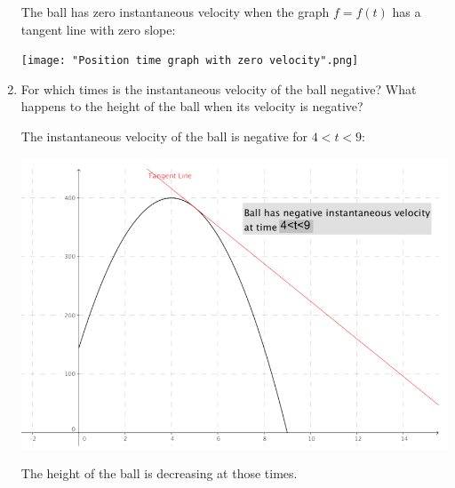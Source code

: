 \documentclass[nooutcomes,handout]{ximera}
\begin{document}
\begin{problem}
\begin{enumerate}
		\begin{freeResponse}		 
		 The ball has zero instantaneous velocity when the graph $f=f(t)$  has a tangent line with zero slope:
        \begin{image}
          \texttt{[image: "Position time graph with zero velocity".png]}
        \end{image}
		\end{freeResponse}
		
		
		
		\item  For which times is the instantaneous velocity of the ball negative?
      What happens to the height of the ball when its velocity is negative?
      \begin{freeResponse}
        The instantaneous velocity of the ball is negative for $4<t<9$:
        \begin{image}
          \includegraphics[scale = 0.5]{figure3.png}
        \end{image}
        The height of the ball is decreasing at those times.
      \end{freeResponse}
			
		\end{enumerate}
			
\end{problem}
	
								
				
\end{document}
